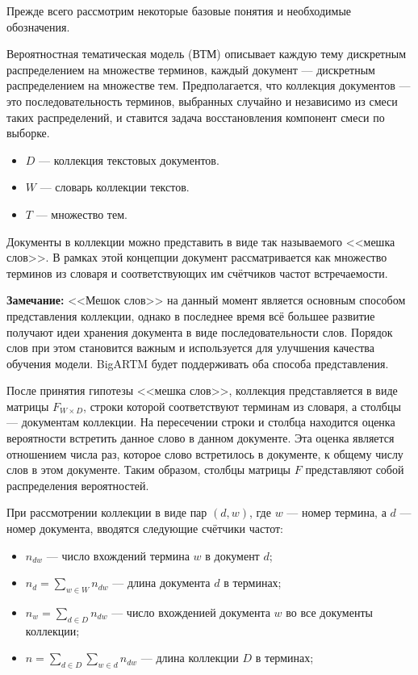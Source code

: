 
Прежде всего рассмотрим некоторые базовые понятия и необходимые обозначения.

Вероятностная тематическая модель (ВТМ) описывает каждую тему дискретным распределением на множестве терминов, каждый документ --- дискретным распределением на множестве тем. Предполагается, что коллекция документов --- это последовательность терминов, выбранных случайно и независимо из смеси таких распределений, и ставится задача восстановления компонент смеси по выборке.

\begin{itemize}
	\item $D$ --- коллекция текстовых документов.
	\item $W$ --- словарь коллекции текстов.
	\item $T$ --- множество тем.
\end{itemize}

Документы в коллекции можно представить в виде так называемого <<мешка слов>>. В рамках этой концепции документ рассматривается как множество терминов из словаря и соответствующих им счётчиков частот встречаемости.

{\bf Замечание: } <<Мешок слов>> на данный момент является основным способом представления коллекции, однако в последнее время всё большее развитие получают идеи хранения документа в виде последовательности слов. Порядок слов при этом становится важным и используется для улучшения качества обучения модели. BigARTM будет поддерживать оба способа представления.

После принятия гипотезы <<мешка слов>>, коллекция представляется в виде матрицы $F_{W \times D}$, строки которой соответствуют терминам из словаря, а столбцы --- документам коллекции. На пересечении строки и столбца находится оценка вероятности встретить данное слово в данном документе. Эта оценка является отношением числа раз, которое слово встретилось в документе, к общему числу слов в этом документе. Таким образом, столбцы матрицы $F$ представляют собой распределения вероятностей.

При рассмотрении коллекции в виде пар $(d, w)$, где $w$ --- номер термина, а $d$ --- номер документа, вводятся следующие счётчики частот:

\begin{itemize}
	\item $n_{dw}$ --- число вхождений термина $w$ в документ $d$;
	\item $n_d = \sum_{w \in W} n_{dw}$ --- длина документа $d$ в терминах;
	\item $n_w = \sum_{d \in D} n_{dw}$ --- число вхожденией документа $w$ во все документы коллекции;
	\item $n = \sum_{d \in D}\sum_{w \in d} n_{dw}$ --- длина коллекции $D$ в терминах; 
\end{itemize}


